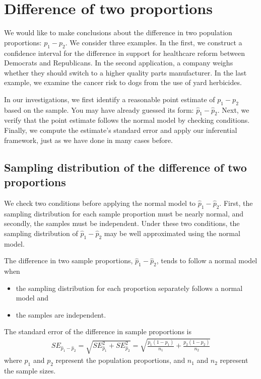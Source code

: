 \section{Difference of two proportions}
\label{differenceOfTwoProportions}

We would like to make conclusions about the difference in two population proportions: $p_1 - p_2$. We consider three examples. In the first, we construct a confidence interval for the difference in support for healthcare reform between Democrats and Republicans. In the second application, a company weighs whether they should switch to a higher quality parts manufacturer. In the last example, we examine the cancer risk to dogs from the use of yard herbicides.

In our investigations, we first identify a reasonable point estimate of $p_1 - p_2$ based on the sample. You may have already guessed its form: $\hat{p}_1 - \hat{p}_2$. Next, we verify that the point estimate follows the normal model by checking conditions. Finally, we compute the estimate's standard error and apply our inferential framework, just as we have done in many cases before.

\subsection{Sampling distribution of the difference of two proportions}

We check two conditions before applying the normal model to $\hat{p}_1 - \hat{p}_2$. First, the sampling distribution for each sample proportion must be nearly normal, and secondly, the samples must be independent. Under these two conditions, the sampling distribution of $\hat{p}_1 - \hat{p}_2$ may be well approximated using the normal model.

\begin{termBox}{
The difference in two sample proportions, $\hat{p}_1 - \hat{p}_2$, tends to follow a normal model when
\begin{itemize}
\item the sampling distribution for each proportion separately follows a normal model and
\item the samples are independent.
\end{itemize}
The standard error of the difference in sample proportions is
\begin{eqnarray}
SE_{\hat{p}_1 - \hat{p}_2}
	= \sqrt{SE_{\hat{p}_1}^2 + SE_{\hat{p}_2}^2}
	= \sqrt{\frac{p_1(1-p_1)}{n_1} + \frac{p_2(1-p_2)}{n_2}}
\label{seForDiffOfProp}
\end{eqnarray}
where $p_1$ and $p_2$ represent the population proportions, and $n_1$ and $n_2$ represent the sample sizes.}
\end{termBox}

